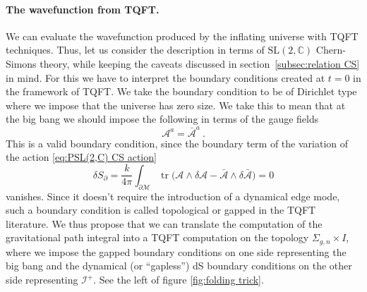 \documentclass[12pt,a4paper]{article}
\newcommand{\be}{\begin{equation}}
\newcommand{\ee}{\end{equation}}
\DeclareMathOperator\tr{tr}
\newcommand\SL{\text{SL}}
\newcommand\CC{\mathbb{C}}
\begin{document}
\paragraph{The wavefunction from TQFT.} We can evaluate the wavefunction produced by the inflating universe with TQFT techniques. Thus, let us consider the description in terms of $\SL(2,\CC)$ Chern-Simons theory, while keeping the caveats discussed in section~\ref{subsec:relation CS} in mind. For this we have to interpret the boundary conditions created at $t=0$ in the framework of TQFT. We take the boundary condition to be of Dirichlet type where we impose that the universe has zero size. 
We take this to mean that at the big bang we should impose the following in terms of the gauge fields
\be 
\mathcal{A}^a=\bar{\mathcal{A}}^a~. \label{eq:big bang boundary conditions}
\ee
This is a valid boundary condition, since the boundary term of the variation of the action \eqref{eq:PSL(2,C) CS action}
\be 
\delta S_\partial=\frac{k}{4\pi} \int_{\partial \mathcal{M}} \tr \big(\mathcal{A} \wedge \delta \mathcal{A}-\bar{\mathcal{A}} \wedge \delta \bar{\mathcal{A}} \big)=0
\ee
vanishes. Since it doesn't require the introduction of a dynamical edge mode, such a boundary condition is called topological or gapped in the TQFT literature. We thus propose that we can translate the computation of the gravitational path integral into a TQFT computation on the topology $\Sigma_{g,n} \times I$, where we impose the gapped boundary conditions on one side representing the big bang and the dynamical (or ``gapless'') dS boundary conditions on the other side representing $\mathcal{I}^+$. See the left of figure \ref{fig:folding trick}.
\end{document}
